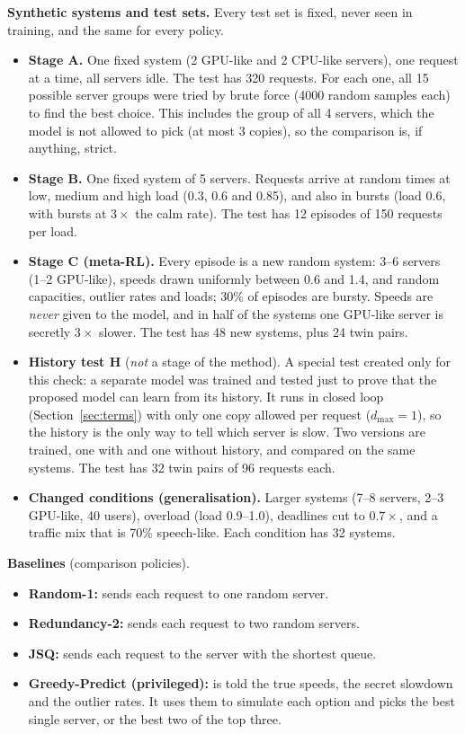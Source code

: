 \documentclass[10pt,a4paper]{article}
\begin{document}
\textbf{Synthetic systems and test sets.} Every test set is fixed, never seen in training, and the same for every policy.
\begin{itemize}
\item \textbf{Stage A.} One fixed system (2 GPU-like and 2 CPU-like servers), one request at a time, all servers idle. The test has 320 requests. For each one, all 15 possible server groups were tried by brute force (4000 random samples each) to find the best choice. This includes the group of all 4 servers, which the model is not allowed to pick (at most 3 copies), so the comparison is, if anything, strict.
\item \textbf{Stage B.} One fixed system of 5 servers. Requests arrive at random times at low, medium and high load (0.3, 0.6 and 0.85), and also in bursts (load 0.6, with bursts at $3\times$ the calm rate). The test has 12 episodes of 150 requests per load.
\item \textbf{Stage C (meta-RL).} Every episode is a new random system: 3--6 servers (1--2 GPU-like), speeds drawn uniformly between 0.6 and 1.4, and random capacities, outlier rates and loads; 30\% of episodes are bursty. Speeds are \emph{never} given to the model, and in half of the systems one GPU-like server is secretly $3\times$ slower. The test has 48 new systems, plus 24 twin pairs.
\item \textbf{History test H} (\emph{not} a stage of the method). A special test created only for this check: a separate model was trained and tested just to prove that the proposed model can learn from its history. It runs in closed loop (Section~\ref{sec:terms}) with only one copy allowed per request ($d_{\max}=1$), so the history is the only way to tell which server is slow. Two versions are trained, one with and one without history, and compared on the same systems. The test has 32 twin pairs of 96 requests each.
\item \textbf{Changed conditions (generalisation).} Larger systems (7--8 servers, 2--3 GPU-like, 40 users), overload (load 0.9--1.0), deadlines cut to $0.7\times$, and a traffic mix that is 70\% speech-like. Each condition has 32 systems.
\end{itemize}

\textbf{Baselines} (comparison policies).
\begin{itemize}
\item \textbf{Random-1:} sends each request to one random server.
\item \textbf{Redundancy-2:} sends each request to two random servers.
\item \textbf{JSQ:} sends each request to the server with the shortest queue.
\item \textbf{Greedy-Predict (privileged):} is told the true speeds, the secret slowdown and the outlier rates. It uses them to simulate each option and picks the best single server, or the best two of the top three.
\end{itemize}
\end{document}
